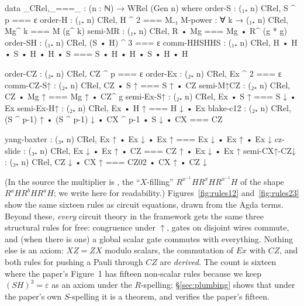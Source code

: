 \begin{agdacode}
data _CRel,_===_ : (n : ℕ) → WRel (Gen n) where
  order-S      :        (₁₊ n) CRel,  S ^ p === ε
  order-H      :        (₁₊ n) CRel,  H ^ 2 === M₋₁
  M-power      : ∀ k →  (₁₊ n) CRel,  Mg^ k === M (g^ k)
  semi-MR      :        (₁₊ n) CRel,  R • Mg === Mg • R^ (g * g)
  order-SH     :        (₁₊ n) CRel,  (S • H) ^ 3 === ε
  comm-HHSHHS  :        (₁₊ n) CRel,  H • H • S • H • H • S === S • H • H • S • H • H

  order-CZ     :        (₂₊ n) CRel,  CZ ^ p === ε
  order-Ex     :        (₂₊ n) CRel,  Ex ^ 2 === ε
  comm-CZ-S↑   :        (₂₊ n) CRel,  CZ • S ↑ === S ↑ • CZ
  semi-M↑CZ    :        (₂₊ n) CRel,  CZ • Mg ↑ === Mg ↑ • CZ^ g
  semi-Ex-S↑   :        (₂₊ n) CRel,  Ex • S ↑ === S ↓ • Ex
  semi-Ex-H↑   :        (₂₊ n) CRel,  Ex • H ↑ === H ↓ • Ex
  blake-c12    :        (₂₊ n) CRel,
                          (S ^ p-1) ↑ • (S ^ p-1) ↓ • CX ^ p-1 • S ↓ • CX === CZ

  yang-baxter  :        (₃₊ n) CRel,  Ex ↑ • Ex ↓ • Ex ↑ === Ex ↓ • Ex ↑ • Ex ↓
  cz-slide     :        (₃₊ n) CRel,  Ex ↓ • Ex ↑ • CZ === CZ ↑ • Ex ↓ • Ex ↑
  semi-CX↑-CZ↓ :        (₃₊ n) CRel,  CZ ↓ • CX ↑ === CZ02 • CX ↑ • CZ ↓
\end{agdacode}

(In the source the multiplier is , the ``$X$-filling''
$R^{x^{-1}}HR^{x}HR^{x^{-1}}H$ of the shape $R^{a}HR^{b}HR^{a}H$; we write
 here for readability.)  Figures~\ref{fig:rules12}
and~\ref{fig:rules23} show the same sixteen rules as circuit equations,
drawn from the Agda terms.  Beyond these, \emph{every} circuit theory in
the framework gets the same three structural rules for free: congruence
under $\uparrow$, gates on disjoint wires commute, and (when there is
one) a global scalar gate commutes with everything.  Nothing else is an
axiom: $XZ = ZX$ modulo scalars, the commutation of $\mathit{Ex}$ with
$CZ$, and both rules for pushing a Pauli through $CZ$ are \emph{derived}.
The count is sixteen where the paper's Figure~1 has fifteen non-scalar
rules because we keep $(SH)^3 = \varepsilon$ as an axiom under the
$R$-spelling; \S\ref{sec:plumbing} shows that under the paper's own
$S$-spelling it is a theorem, and verifies the paper's fifteen.


